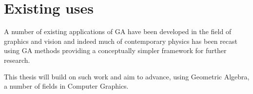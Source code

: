 \section{Existing uses}

A number of existing applications of GA have been developed in the
field of graphics and vision\cite{DBLP:conf/giae/WarehamCL04,SahanLasenby} and
indeed much of contemporary physics has been recast using GA 
methods\cite{DoranLasenby} providing a conceptually simpler
framework for further research.

This thesis will build on such work and aim to advance, using Geometric
Algebra, a number of fields in Computer Graphics.

